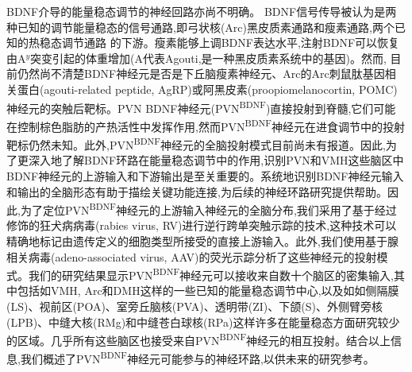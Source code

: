 BDNF介导的能量稳态调节的神经回路亦尚不明确。 BDNF信号传导被认为是两种已知的调节能量稳态的信号通路,即弓状核(Arc)黑皮质素通路\citep{xu2003brain}和瘦素通路\citep{liao2012dendritically},两个已知的热稳态调节通路
\citep{waterson2015neuronal, krashes2016melanocortin}的下游。瘦素能够上调BDNF表达水平,注射BDNF可以恢复由A$^{y}$突变引起的体重增加(A代表Agouti,是一种黑皮质素系统中的基因)。然而, 目前仍然尚不清楚BDNF神经元是否是下丘脑瘦素神经元、Arc的Arc刺鼠肽基因相关蛋白(agouti-related peptide, AgRP)或阿黑皮素(proopiomelanocortin, POMC)神经元的突触后靶标。PVN BDNF神经元(PVN\textsuperscript{BDNF})直接投射到脊髓,它们可能在控制棕色脂肪的产热活性中发挥作用,然而PVN\textsuperscript{BDNF}神经元在进食调节中的投射靶标仍然未知\citep{an2015discrete}。此外,PVN\textsuperscript{BDNF}神经元的全脑投射模式目前尚未有报道。因此,为了更深入地了解BDNF环路在能量稳态调节中的作用,识别PVN和VMH这些脑区中BDNF神经元的上游输入和下游输出是至关重要的。系统地识别BDNF神经元输入和输出的全脑形态有助于描绘关键功能连接,为后续的神经环路研究提供帮助。因此,为了定位PVN\textsuperscript{BDNF}神经元的上游输入神经元的全脑分布,我们采用了基于经过修饰的狂犬病病毒(rabies virus, RV)进行逆行跨单突触示踪的技术,这种技术可以精确地标记由遗传定义的细胞类型所接受的直接上游输入\citep{wickersham2007monosynaptic}。此外,我们使用基于腺相关病毒(adeno-associated virus, AAV)的荧光示踪分析了这些神经元的投射模式。我们的研究结果显示PVN\textsuperscript{BDNF}神经元可以接收来自数十个脑区的密集输入,其中包括如VMH, Arc和DMH这样的一些已知的能量稳态调节中心,以及如如侧隔膜(LS)、视前区(POA)、室旁丘脑核(PVA)、透明带(ZI)、下颌(S)、外侧臂旁核(LPB)、中缝大核(RMg)和中缝苍白球核(RPa)这样许多在能量稳态方面研究较少的区域。几乎所有这些脑区也接受来自PVN\textsuperscript{BDNF}神经元的相互投射。结合以上信息,我们概述了PVN\textsuperscript{BDNF}神经元可能参与的神经环路,以供未来的研究参考。
